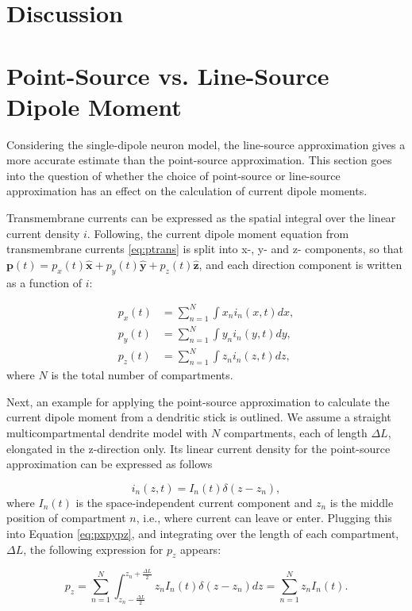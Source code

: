 \documentclass[preprint,10pt,authoryear]{elsarticle}
\begin{document}
\section{Discussion}\label{sec:discussion}
\appendix
\section{Point-Source vs. Line-Source Dipole Moment} \label{sec:point_line_cdm}
Considering the single-dipole neuron model, the line-source approximation gives a more accurate estimate than the point-source approximation. This section goes into the question of whether the choice of point-source or line-source approximation has an effect on the calculation of current dipole moments.

Transmembrane currents can be expressed as the spatial integral over the linear current density $i$. Following, the current dipole moment equation from transmembrane currents \eqref{eq:ptrans} is split into x-, y- and z- components, so that $\mathbf{p}(t) = p_x(t)\mathbf{\hat{x}} + p_y(t)\mathbf{\hat{y}} + p_z(t)\mathbf{\hat{z}}$, and each direction component is written as a function of $i$:

\begin{align}\label{eq:pxpypz}
p_x(t) &= \sum_{n=1}^N\int x_n i_n(x,t) dx, \nonumber\\
p_y(t) &= \sum_{n=1}^N\int y_n i_n(y,t) dy, \\
p_z(t) &= \sum_{n=1}^N\int z_n i_n(z,t) dz, \nonumber
\end{align}
where $N$ is the total number of compartments.

Next, an example for applying the point-source approximation to calculate the current dipole moment from a dendritic stick is outlined. We assume a straight multicompartmental dendrite model with $N$ compartments, each of length $\Delta L$, elongated in the z-direction only. Its linear current density for the point-source approximation can be expressed as follows

\begin{equation}
i_n(z,t) = I_n(t) \delta(z - z_n),
\end{equation}
where $I_n(t)$ is the space-independent current component and $z_n$ is the middle position of compartment $n$, i.e., where current can leave or enter. Plugging this into Equation \eqref{eq:pxpypz}, and integrating over the length of each compartment, $\Delta L$, the following expression for $p_z$ appears:

\begin{equation}
p_z = \sum_{n=1}^N \int_{z_n - \frac{\Delta{L}}{2}}^{z_n + \frac{\Delta L}{2}} z_n I_n(t) \delta(z - z_n)dz = \sum_{n=1}^N z_n I_n(t).
\end{equation}
\end{document}
